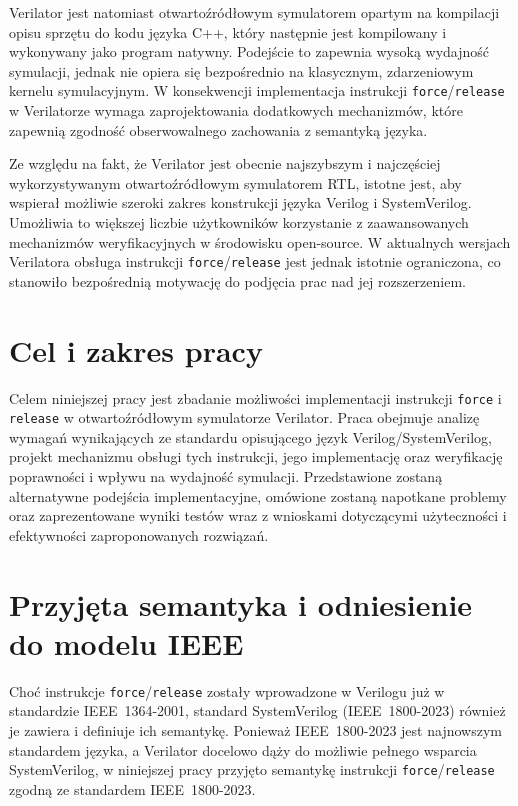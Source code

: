 \documentclass[shortabstract, inz]{iithesis}
\newcounter{kod}[chapter]
\begin{document}
Verilator\cite{Verilator} jest natomiast otwartoźródłowym symulatorem opartym na kompilacji opisu sprzętu do kodu języka C++, który następnie jest kompilowany i wykonywany jako program natywny. Podejście to zapewnia wysoką wydajność symulacji, jednak nie opiera się bezpośrednio na klasycznym, zdarzeniowym kernelu symulacyjnym. W konsekwencji implementacja instrukcji \texttt{force}/\texttt{release} w Verilatorze wymaga zaprojektowania dodatkowych mechanizmów, które zapewnią zgodność obserwowalnego zachowania z semantyką języka.

Ze względu na fakt, że Verilator jest obecnie najszybszym i najczęściej wykorzystywanym otwartoźródłowym symulatorem RTL, istotne jest, aby wspierał możliwie szeroki zakres konstrukcji języka Verilog i SystemVerilog. Umożliwia to większej liczbie użytkowników korzystanie z zaawansowanych mechanizmów weryfikacyjnych w środowisku open-source. W aktualnych wersjach Verilatora obsługa instrukcji \texttt{force}/\texttt{release} jest jednak istotnie ograniczona, co stanowiło bezpośrednią motywację do podjęcia prac nad jej rozszerzeniem.

\section{Cel i zakres pracy}

Celem niniejszej pracy jest zbadanie możliwości implementacji instrukcji \texttt{force} i \texttt{release} w otwartoźródłowym symulatorze Verilator. Praca obejmuje analizę wymagań wynikających ze standardu opisującego język Verilog/SystemVerilog, projekt mechanizmu obsługi tych instrukcji, jego implementację oraz weryfikację poprawności i wpływu na wydajność symulacji. Przedstawione zostaną alternatywne podejścia implementacyjne, omówione zostaną napotkane problemy oraz zaprezentowane wyniki testów wraz z wnioskami dotyczącymi użyteczności i efektywności zaproponowanych rozwiązań.

\section{Przyjęta semantyka i odniesienie do modelu IEEE}

Choć instrukcje \texttt{force}/\texttt{release} zostały wprowadzone w Verilogu już w standardzie IEEE~1364-2001\cite{IEEE1364-2001}, standard SystemVerilog (IEEE~1800-2023)\cite{IEEE1800-2023} również je zawiera i definiuje ich semantykę. Ponieważ IEEE~1800-2023 jest najnowszym standardem języka, a Verilator docelowo dąży do możliwie pełnego wsparcia SystemVerilog, w niniejszej pracy przyjęto semantykę instrukcji \texttt{force}/\texttt{release} zgodną ze standardem IEEE~1800-2023\cite{IEEE1800-2023}.
\end{document}
